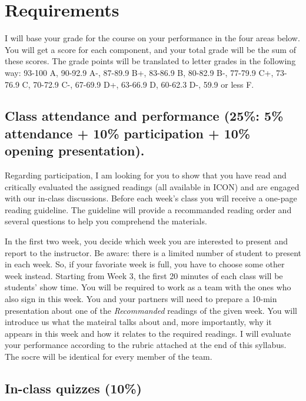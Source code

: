 \documentclass[11pt,]{article}
\theoremstyle{definition}
\theoremstyle{definition}
\theoremstyle{remark}
\begin{document}
\section{Requirements}\label{requirements}

I will base your grade for the course on your performance in the four
areas below. You will get a score for each component, and your total
grade will be the sum of these scores. The grade points will be
translated to letter grades in the following way: 93-100 A, 90-92.9 A-,
87-89.9 B+, 83-86.9 B, 80-82.9 B-, 77-79.9 C+, 73-76.9 C, 70-72.9 C-,
67-69.9 D+, 63-66.9 D, 60-62.3 D-, 59.9 or less F.

\subsection{Class attendance and performance (25\%: 5\% attendance +
10\% participation + 10\% opening
presentation).}\label{class-attendance-and-performance-25-5-attendance-10-participation-10-opening-presentation.}

Regarding participation, I am looking for you to show that you have read
and critically evaluated the assigned readings (all available in ICON)
and are engaged with our in-class discussions. Before each week's class
you will receive a one-page reading guideline. The guideline will
provide a recommanded reading order and several questions to help you
comprehend the materials.

In the first two week, you decide which week you are interested to
present and report to the instructor. Be aware: there is a limited
number of student to present in each week. So, if your favoriate week is
full, you have to choose some other week instead. Starting from Week 3,
the first 20 minutes of each class will be students' show time. You will
be required to work as a team with the ones who also sign in this week.
You and your partners will need to prepare a 10-min presentation about
one of the \emph{Recommanded} readings of the given week. You will
introduce us what the mateiral talks about and, more importantly, why it
appears in this week and how it relates to the required readings. I will
evaluate your performance according to the rubric attached at the end of
this syllabus. The socre will be identical for every member of the team.

\subsection{In-class quizzes (10\%)}\label{in-class-quizzes-10}
\end{document}
